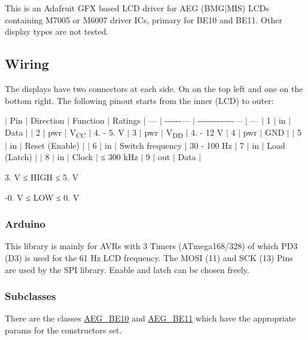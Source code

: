 This is an Adafruit G\+FX based L\+CD driver for A\+EG (B\+M\+G$\vert$\+M\+IS) L\+C\+Ds containing M7005 or M6007 driver I\+Cs, primary for B\+E10 and B\+E11. Other display types are not tested.

\subsection*{Wiring}

The displays have two connectors at each side. On on the top left and one on the bottom right. The following pinout starts from the inner (L\+CD) to outer\+:

$\vert$ Pin $\vert$ Direction $\vert$ Function $\vert$ Ratings $\vert$ --- $\vert$ -\/-\/-\/-\/-\/-\/--- $\vert$ -\/-\/-\/-\/-\/-\/-\/-\/-\/-\/-\/-\/-\/--- $\vert$ --- $\vert$ 1 $\vert$ in $\vert$ Data $\vert$ $\vert$ 2 $\vert$ pwr $\vert$ V\textsubscript{CC} $\vert$ 4. -\/ 5. V $\vert$ 3 $\vert$ pwr $\vert$ V\textsubscript{DD} $\vert$ 4. -\/ 12 V $\vert$ 4 $\vert$ pwr $\vert$ G\+ND $\vert$ $\vert$ 5 $\vert$ in $\vert$ Reset (Enable) $\vert$ $\vert$ 6 $\vert$ in $\vert$ Switch frequency $\vert$ 30 -\/ 100 Hz $\vert$ 7 $\vert$ in $\vert$ Load (Latch) $\vert$ $\vert$ 8 $\vert$ in $\vert$ Clock $\vert$ ≤ 300 k\+Hz $\vert$ 9 $\vert$ out $\vert$ Data $\vert$

3. V ≤ H\+I\+GH ≤ 5. V

-\/0. V ≤ L\+OW ≤ 0. V

\subsubsection*{Arduino}

This library is mainly for A\+V\+Rs with 3 Timers (A\+Tmega168/328) of which P\+D3 (D3) is used for the 61 Hz L\+CD frequency. The M\+O\+SI (11) and S\+CK (13) Pins are used by the S\+PI library. Enable and latch can be chosen freely.

\subsubsection*{Subclasses}

There are the classes {\ttfamily \hyperlink{class_a_e_g___b_e10}{A\+E\+G\+\_\+\+B\+E10}} and {\ttfamily \hyperlink{class_a_e_g___b_e11}{A\+E\+G\+\_\+\+B\+E11}} which have the appropriate params for the constructors set. 